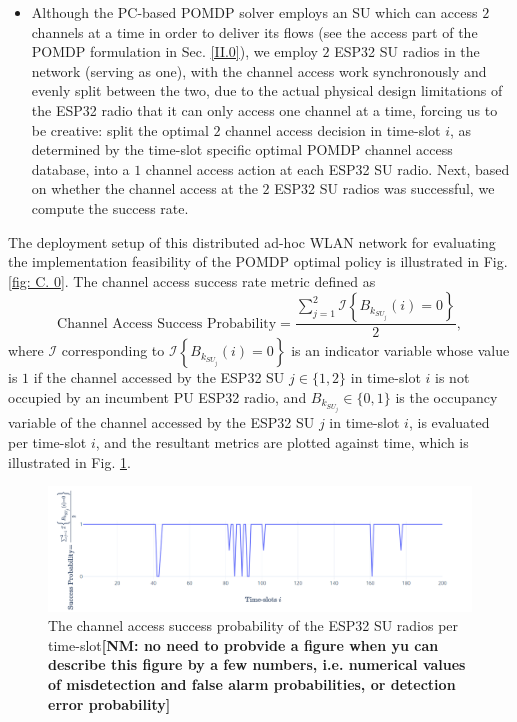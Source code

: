 \documentclass[12pt, draftcls, onecolumn]{IEEEtran}
\newcommand{\nm}[1]{{\color{blue}\bf{[NM: #1]}}}
\begin{document}
\begin{itemize}
    \item Although the PC-based POMDP solver employs an SU which can access $2$ channels at a time in order to deliver its flows (see the access part of the POMDP formulation in Sec. \ref{II.0}), we employ $2$ ESP32 SU radios in the network (serving as one), with the channel access work synchronously and evenly split between the two, due to the actual physical design limitations of the ESP32 radio that it can only access one channel at a time, forcing us to be creative: split the optimal $2$ channel access decision in time-slot $i$, as determined by the time-slot specific optimal POMDP channel access database, into a $1$ channel access action at each ESP32 SU radio. Next, based on whether the channel access at the $2$ ESP32 SU radios was successful, we compute the success rate.
\end{itemize}
The deployment setup of this distributed ad-hoc WLAN network for evaluating the implementation feasibility of the POMDP optimal policy is illustrated in Fig. \ref{fig: C. 0}. The channel access success rate metric defined as
\begin{equation}\label{C.I}
    \text{Channel Access Success Probability}=\frac{\sum_{j=1}^{2}\mathcal{I}\left\{B_{k_{SU_{j}}}(i)=0\right\}}{2},
\end{equation}
where $\mathcal{I}$ corresponding to $\mathcal{I}\left\{B_{k_{SU_{j}}}(i)=0\right\}$ is an indicator variable whose value is $1$ if the channel accessed by the ESP32 SU $j{\in}\{1,2\}$ in time-slot $i$ is not occupied by an incumbent PU ESP32 radio, and $B_{k_{SU_{j}}}{\in}\{0,1\}$ is the occupancy variable of the channel accessed by the ESP32 SU $j$ in time-slot $i$, is evaluated per time-slot $i$, and the resultant metrics are plotted against time, which is illustrated in Fig. \ref{fig:C.1}.
\begin{figure} [htb]
    \centerline{
    \includegraphics[width = 0.8\linewidth]{figures/ESP32_Success_Probability.PNG}}
    \caption{The channel access success probability of the ESP32 SU radios per time-slot\nm{no need to probvide a figure when yu can describe this figure by a few numbers, i.e. numerical values of misdetection and false alarm probabilities, or detection error probability}}
    \label{fig:C.1}
\end{figure}
\end{document}
